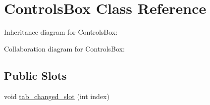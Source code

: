 \hypertarget{classControlsBox}{\section{Controls\+Box Class Reference}
\label{classControlsBox}
}


Inheritance diagram for Controls\+Box\+:


Collaboration diagram for Controls\+Box\+:
\subsection*{Public Slots}
\begin{DoxyCompactItemize}
\item 
void \hyperlink{classControlsBox_a07e278f28564462700e44c9f7b4da850}{tab\+\_\+changed\+\_\+slot} (int index)
\end{DoxyCompactItemize}
